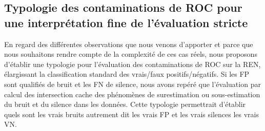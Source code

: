 


\subsection{Typologie des contaminations de ROC pour une interprétation fine de l'évaluation stricte }
\label{subsec:Typologie_OCR-IMPACT-NER}
En regard des différentes observations que nous venons d'apporter et parce que nous souhaitons rendre compte de la complexité de ces cas réels, nous proposons d'établir une typologie pour l'évaluation des contaminations de ROC sur la REN, élargissant la classification standard des vrais/faux positifs/négatifs. Si les FP sont qualifiés de bruit et les FN de silence, nous avons repéré que l'évaluation par calcul des intersection cache des phénomènes de surestimation ou sous-estimation du bruit et du silence dans les données. Cette typologie permettrait d'établir quels sont les vrais bruits autrement dit les vrais FP et les vrais silences les vrais VN. 


